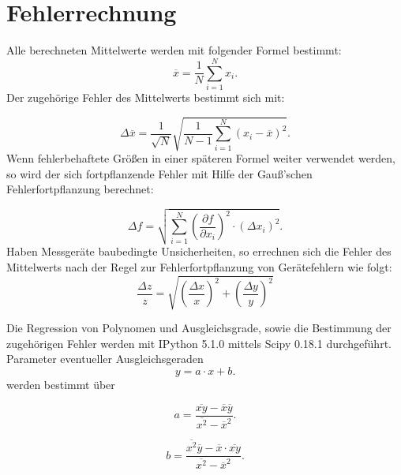 \section{Fehlerrechnung}
\label{sec:fehlerrechnung}
Alle berechneten Mittelwerte werden mit folgender Formel bestimmt:
\begin{equation}
  \label{eqn:mittelwert}
  \overline x=\frac{1}{N}\sum \limits_{i=1}^{N} x_i .
\end{equation}
Der zugehörige Fehler des Mittelwerts bestimmt sich mit:

\begin{equation}
  \label{eqn:mittelwertfehler}
  \Delta \overline x= \frac{1}{\sqrt{N}} \sqrt{\frac{1}{N-1} \sum \limits_{i=1}^{N} (x_i- \overline x)^2}.
\end {equation}
Wenn fehlerbehaftete Größen in einer späteren Formel weiter verwendet werden, so wird der sich fortpflanzende Fehler
mit Hilfe der Gauß’schen Fehlerfortpflanzung berechnet:

\begin{equation}
  \label{eqn:fehlerfortpflanzung}
  \Delta f = \sqrt{ \sum \limits_{i = 1}^{N} (\frac{\partial f}{\partial x_i})^2 \cdot (\Delta x_i)^2}.
\end{equation}
Haben Messgeräte baubedingte Unsicherheiten, so errechnen sich die Fehler des Mittelwerts nach der Regel zur Fehlerfortpflanzung von Gerätefehlern wie folgt:
 \begin{equation}
   \frac{\Delta z}{z}=\sqrt{(\frac{\Delta x}{x})^2+(\frac{\Delta y}{y})^2}
\end{equation}

Die Regression von Polynomen und Ausgleichsgrade, sowie die Bestimmung der zugehörigen Fehler werden mit
IPython 5.1.0 mittels Scipy 0.18.1 durchgeführt.
Parameter eventueller Ausgleichsgeraden
\begin{equation}
\label{eqn:ausgleichsgrade}
y=a \cdot x +b .
\end{equation}
werden bestimmt über

\begin{equation}
\label{eqn:ausgleichsgrade_a}
a= \frac{ \overline{xy}- \overline{x} \overline{y}}{\overline{x^2}-\overline{x}^2} .
\end{equation}

\begin{equation}
\label{eqn:ausgleichsgrade_b}
b= \frac{ \overline{x^2} \overline{y}- \overline{x} \cdot \overline{xy}}{\overline{x^2}-\overline{x}^2} .
\end{equation}
